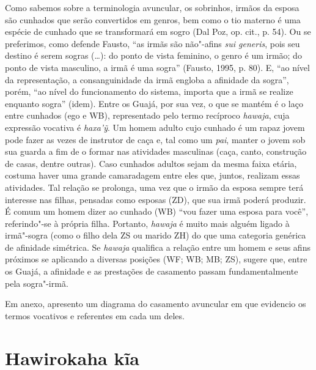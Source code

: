 Como sabemos sobre a terminologia avuncular, os sobrinhos, irmãos da
esposa são cunhados que serão convertidos em genros, bem como o tio
materno é uma espécie de cunhado que se transformará em sogro (Dal Poz,
op. cit., p. 54). Ou se preferimos, como defende Fausto, ``as irmãs são
não"-afins \emph{sui generis}, pois seu destino é serem sogras (\ldots{}): do
ponto de vista feminino, o genro é um irmão; do ponto de vista
masculino, a irmã é uma sogra'' (Fausto, 1995, p. 80). E, ``ao nível da
representação, a consanguinidade da irmã engloba a afinidade da sogra'',
porém, ``ao nível do funcionamento do sistema, importa que a irmã se
realize enquanto sogra'' (idem). Entre os Guajá, por sua vez, o que se
mantém é o laço entre cunhados (ego e WB), representado pelo termo
recíproco \emph{hawaja}, cuja expressão vocativa é \emph{haxa'ỹ}. Um
homem adulto cujo cunhado é um rapaz jovem pode fazer as vezes de
instrutor de caça e, tal como um \emph{pai}, manter o jovem sob sua
guarda a fim de o formar nas atividades masculinas (caça, canto,
construção de casas, dentre outras). Caso cunhados adultos sejam da
mesma faixa etária, costuma haver uma grande camaradagem entre eles que,
juntos, realizam essas atividades. Tal relação se prolonga, uma vez que
o irmão da esposa sempre terá interesse nas filhas, pensadas como
esposas (ZD), que sua irmã poderá produzir. É comum um homem dizer ao
cunhado (WB) ``vou fazer uma esposa para você'', referindo"-se à própria
filha. Portanto, \emph{hawaja} é muito mais alguém ligado à irmã"-sogra
(como o filho dela ZS ou marido ZH) do que uma categoria genérica de
afinidade simétrica. Se \emph{hawaja} qualifica a relação entre um homem
e seus afins próximos se aplicando a diversas posições (WF; WB; MB; ZS),
sugere que, entre os Guajá, a afinidade e as prestações de casamento
passam fundamentalmente pela sogra"-irmã.

Em anexo, apresento um diagrama do casamento avuncular em que evidencio
os termos vocativos e referentes em cada um deles.

\section{Hawirokaha kĩa}

